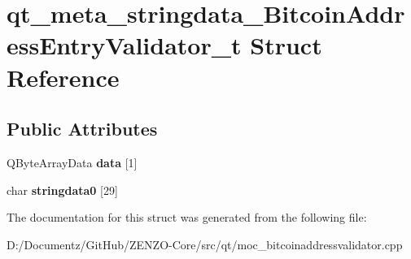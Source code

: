 \hypertarget{structqt__meta__stringdata___bitcoin_address_entry_validator__t}{}\section{qt\+\_\+meta\+\_\+stringdata\+\_\+\+Bitcoin\+Address\+Entry\+Validator\+\_\+t Struct Reference}
\label{structqt__meta__stringdata___bitcoin_address_entry_validator__t}
\subsection*{Public Attributes}
\begin{DoxyCompactItemize}
\item 
\mbox{\label{structqt__meta__stringdata___bitcoin_address_entry_validator__t_a3d52c6add99f9c93793b5e9fa0b575fa}} 
Q\+Byte\+Array\+Data {\bfseries data} \mbox{[}1\mbox{]}
\item 
\mbox{\label{structqt__meta__stringdata___bitcoin_address_entry_validator__t_aa2f919eeaa03bc064e9eb47555fc98e0}} 
char {\bfseries stringdata0} \mbox{[}29\mbox{]}
\end{DoxyCompactItemize}


The documentation for this struct was generated from the following file\+:\begin{DoxyCompactItemize}
\item 
D\+:/\+Documentz/\+Git\+Hub/\+Z\+E\+N\+Z\+O-\/\+Core/src/qt/moc\+\_\+bitcoinaddressvalidator.\+cpp\end{DoxyCompactItemize}
